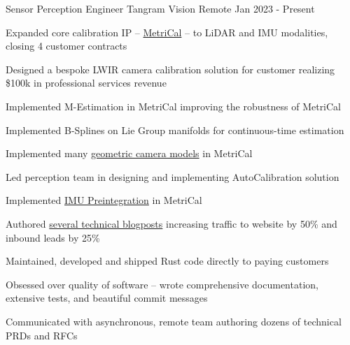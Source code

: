 

\begin{cventries}
  \cventry
    {Sensor Perception Engineer}
    {Tangram Vision}
    {Remote}
    {Jan 2023 - Present}
    {
        \begin{cvitems}
            \item{Expanded core calibration IP -- \href{https://docs.tangramvision.com/metrical/intro}{\color{awesome-skyblue}MetriCal} -- to LiDAR and IMU modalities, closing 4 customer contracts}
            \item{Designed a bespoke LWIR camera calibration solution for customer realizing \$100k in professional services revenue}
            \item{Implemented M-Estimation in MetriCal improving the robustness of MetriCal}
            \item{Implemented B-Splines on Lie Group manifolds for continuous-time estimation}
            \item{Implemented many \href{https://docs.tangramvision.com/metrical/core_concepts/component_models/cameras/}{\color{awesome-skyblue}geometric camera models} in MetriCal}
            \item{Led perception team in designing and implementing AutoCalibration solution}
            \item{Implemented \href{https://www.tangramvision.com/blog/imu-preintegration-basics-part-5-of-5}{\color{awesome-skyblue}IMU Preintegration} in MetriCal}
            \item{Authored \href{https://www.tangramvision.com/author/devon-morris}{\color{awesome-skyblue}several technical blogposts} increasing traffic to website by 50\% and inbound leads by 25\%}
            \item{Maintained, developed and shipped Rust code directly to paying customers}
            \item{Obsessed over quality of software -- wrote comprehensive documentation, extensive tests, and beautiful commit messages}
            \item{Communicated with asynchronous, remote team authoring dozens of technical PRDs and RFCs}
        \end{cvitems}
    }


\end{cventries}
